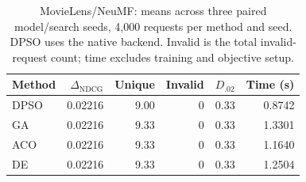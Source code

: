 \begin{table}[t]
\centering
\caption{MovieLens/NeuMF: means across three paired model/search seeds, 4,000 requests per method and seed. DPSO uses the native backend. Invalid is the total invalid-request count; time excludes training and objective setup.}
\label{tab:neumf}
\small
\begin{tabular}{lrrrrr}
\toprule
Method & $\Delta_{\mathrm{NDCG}}$ & Unique & Invalid & $D_{.02}$ & Time (s) \\
\midrule
DPSO & 0.02216 & 9.00 & 0 & 0.33 & 0.8742 \\
GA & 0.02216 & 9.33 & 0 & 0.33 & 1.3301 \\
ACO & 0.02216 & 9.33 & 0 & 0.33 & 1.1640 \\
DE & 0.02216 & 9.33 & 0 & 0.33 & 1.2504 \\
\bottomrule
\end{tabular}
\end{table}
